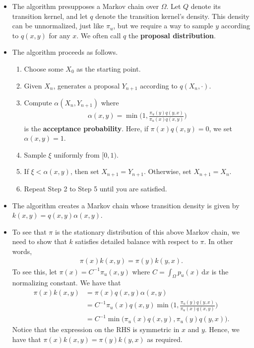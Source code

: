\documentclass[10pt]{article}
\newcommand{\dee}{\mathrm{d}}
\begin{document}
\begin{itemize}
  \item The algorithm presupposes a Markov chain over $\Omega$. Let $Q$ denote its transition kernel, and let $q$ denote the transition kernel's density. This density can be unnormalized, just like $\pi_u$, but we require a way to sample $y$ according to $q(x,y)$ for any $x$. We often call $q$ the {\bf proposal distribution}.
  
  \item The algorithm proceeds as follows.
  \begin{enumerate}
    \item Choose some $X_0$ as the starting point.
    \item Given $X_n$, generates a proposal $Y_{n+1}$ according to $q(X_n, \cdot)$.
    \item Compute $\alpha(X_n, Y_{n+1})$ where
    \begin{align*}
      \alpha(x,y) = \min\bigg( 1, \frac{\pi_u(y)q(y,x)}{\pi_u(x)q(x,y)} \bigg)
    \end{align*}
    is the {\bf acceptance probability}.
    Here, if $\pi(x)q(x,y) = 0$, we set $\alpha(x,y) = 1$.
    \item Sample $\xi$ uniformly from $[0,1)$.
    \item If $\xi < \alpha(x,y)$, then set $X_{n+1} = Y_{n+1}$. Otherwise, set $X_{n+1} = X_n$.
    \item Repeat Step 2 to Step 5 until you are satisfied.
  \end{enumerate}

  \item The algorithm creates a Markov chain whose transition density is given by $k(x,y) = q(x,y)\alpha(x,y)$. 
  
  \item To see that $\pi$ is the stationary distribution of this above Markov chain, we need to show that $k$ satisfies detailed balance with respect to $\pi$. In other words,
  \begin{align*}
    \pi(x)k(x,y) = \pi(y)k(y,x).
  \end{align*}
  To see this, let $\pi(x) = C^{-1} \pi_u(x,y)$ where $C = \int_\Omega p_u(x)\, \dee x$ is the normalizing constant. We have that
  \begin{align*}
    \pi(x) k(x,y)
    &= \pi(x) q(x,y) \alpha(x,y) \\
    &= C^{-1}\pi_u(x) q(x,y) \min\bigg( 1, \frac{\pi_u(y)q(y,x)}{\pi_u(x)q(x,y)} \bigg)\\
    &= C^{-1} \min\bigg( \pi_u(x) q(x,y) , \pi_u(y)q(y,x) \bigg).    
  \end{align*}
  Notice that the expression on the RHS is symmetric in $x$ and $y$. Hence, we have that $\pi(x)k(x,y) = \pi(y)k(y,x)$ as required.


\end{itemize}
\end{document}
